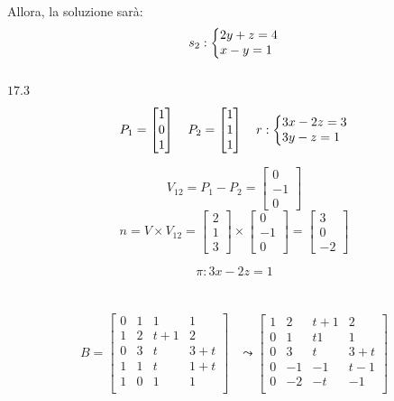 \documentclass{article}
\makeatletter
\newcommand*{\m}[1]{\begin{bmatrix}#1\end{bmatrix}}
\newcommand*{\sys}[1]{\left\{\begin{array}{@{}l@{}}#1\end{array}\right.}
\makeatother
\begin{document}
Allora, la soluzione sarà:
\[s_2:\sys{2y+z=4\\x-y=1}\]

\subsection{}
$17.3$

\[P_1=\m{1\\0\\1}\quad P_2=\m{1\\1\\1}\quad r:\sys{3x-2z=3\\3y-z=1}\]

\[V_{12}=P_1-P_2=\m{0\\-1\\0}\]
\[n=V\times V_{12}=\m{2\\1\\3}\times\m{0\\-1\\0}=\m{3\\0\\-2}\]

\[\pi: 3x-2z=1\]

\section{}
\[\begin{aligned}B=\m{
    0&1&1&1\\
    1&2&t+1&2\\
    0&3&t&3+t\\
    1&1&t&1+t\\
    1&0&1&1\\
}&\leadsto\m{
    1&2&t+1&2\\
    0&1&t1&1\\
    0&3&t&3+t\\
    0&-1&-1&t-1\\
    0&-2&-t&-1\\
}\end{aligned}\]
\end{document}
